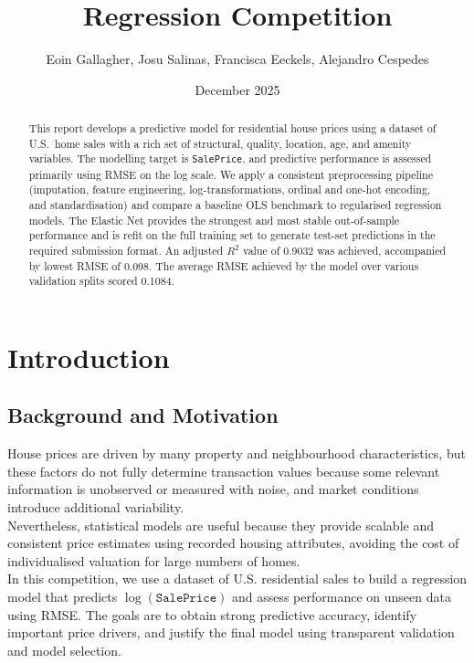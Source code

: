 \documentclass[12pt,oneside]{article} %
\title{Regression Competition}
\author{Eoin Gallagher, Josu Salinas, Francisca Eeckels, Alejandro Cespedes}
\date{December 2025}
\begin{document}
\maketitle

\begin{abstract}
\noindent
This report develops a predictive model for residential house prices using a dataset of U.S.\ home sales with a rich set of structural, quality, location, age, and amenity variables. The modelling target is \texttt{SalePrice}, and predictive performance is assessed primarily using RMSE on the log scale. We apply a consistent preprocessing pipeline (imputation, feature engineering, log-transformations, ordinal and one-hot encoding, and standardisation) and compare a baseline OLS benchmark to regularised regression models. The Elastic Net provides the strongest and most stable out-of-sample performance and is refit on the full training set to generate test-set predictions in the required submission format. An adjusted \(R^2\) value of 0.9032 was achieved, accompanied by lowest RMSE of 0.098. The average RMSE achieved by the model over various validation splits scored 0.1084. 
\end{abstract}

\section{Introduction}

\subsection{Background and Motivation}

\noindent 
House prices are driven by many property and neighbourhood characteristics, but these factors do not fully determine transaction values because some relevant information is unobserved or measured with noise, and market conditions introduce additional variability.\\

\noindent 
Nevertheless, statistical models are useful because they provide scalable and consistent price estimates using recorded housing attributes, avoiding the cost of individualised valuation for large numbers of homes.\\

\noindent 
In this competition, we use a dataset of U.S. residential sales to build a regression model that predicts $\log(\texttt{SalePrice})$ and assess performance on unseen data using RMSE. The goals are to obtain strong predictive accuracy, identify important price drivers, and justify the final model using transparent validation and model selection. 
\end{document}
